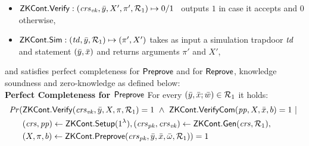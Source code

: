 \begin{definition}[ZK Continuations]
\begin{itemize}
\item ${\mathsf{ZKCont}}.{\mathsf{Verify}}: (\mathit{crs}_{\mathit{vk}}, \bar{y}, X', \pi', \mathcal{R}_1) \mapsto 0/1$ \, outputs $1$ in case it accepts and $0$ otherwise,

\item ${\mathsf{ZKCont}}.{\mathsf{Sim}}: (\mathit{td}, \bar{y}, \mathcal{R}_1) \mapsto (\pi', X')$ takes as input a simulation trapdoor $\mathit{td}$ and statement $(\bar{y}, \bar{x})$ and returns 
arguments $\pi'$ and $X'$,
\end{itemize}
and satisfies perfect completeness for ${\mathsf{Preprove}}$ and for ${\mathsf{Reprove}}$,  knowledge soundness and zero-knowledge as defined below:\\
\noindent \textbf{Perfect Completeness for ${\mathsf{Preprove}}$} For every $(\bar{y}, \bar{x}; \bar{w}) \in \mathcal{R}_1$ it holds:
\begin{align*}
\mathit{Pr} (& {\mathsf{ZKCont}}.{\mathsf{Verify}}(\mathit{crs}_{\mathit{vk}}, \bar{y}, X, \pi, \mathcal{R}_1) = 1 \ \wedge \ {\mathsf{ZKCont}}.{\mathsf{VerifyCom}} (\mathit{pp}, X, \bar{x}, b) = 1\  | \ \\ 
                   & (\mathit{crs}, \mathit{pp}) \leftarrow {\ensuremath{\mathsf{ZKCont}}}.{\mathsf{Setup}} (1^{\lambda}), (\mathit{crs}_{\mathit{pk}}, \mathit{crs}_{\mathit{vk}}) \leftarrow {\ensuremath{\mathsf{ZKCont}}}.\mathsf{Gen}(\mathit{crs}, \mathcal{R}_1), \\ 
                   & (X, \pi, b) \leftarrow {\ensuremath{\mathsf{ZKCont}}}.{\mathsf{Preprove}}(\mathit{crs}_{\mathit{pk}}, \bar{y}, \bar{x}, \bar{\omega}, \mathcal{R}_1)) = 1
\end{align*}


\end{definition}
